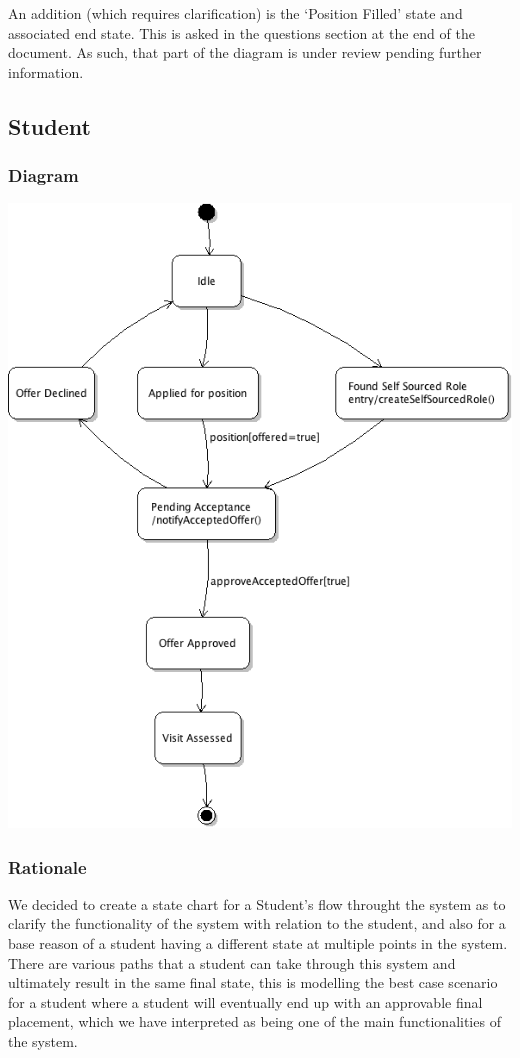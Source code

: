 \documentclass[11pt]{article}
\begin{document}
An addition (which requires clarification) is the `Position Filled' state and
associated end state. This is asked in the questions section at the end of the
document. As such, that part of the diagram is under review pending further
information.

\subsection{Student}

\subsubsection{Diagram}

\includegraphics[width=\textwidth]{studentState.png}

\subsubsection{Rationale}

We decided to create a state chart for a Student's flow throught the
system as to clarify the functionality of the system with relation to
the student, and also for a base reason of a student having a
different state at multiple points in the system. There are various
paths that a student can take through this system and ultimately
result in the same final state, this is modelling the best case
scenario for a student where a student will eventually end up with an
approvable final placement, which we have interpreted as being one of
the main functionalities of the system. 
\end{document}
